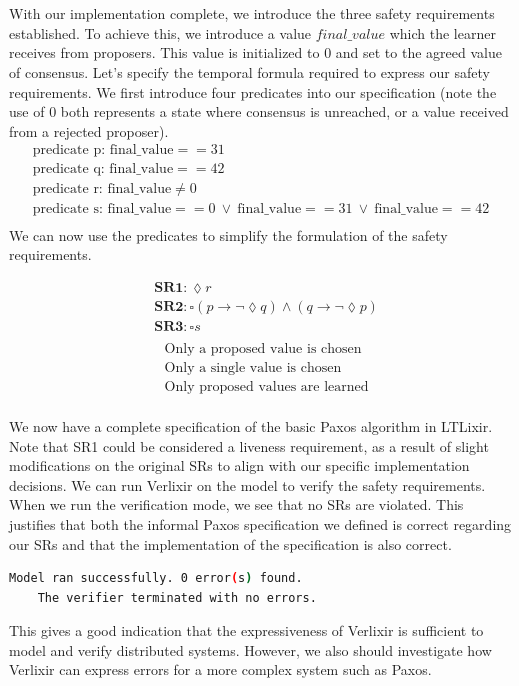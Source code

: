\\ \\
With our implementation complete, we introduce the three safety requirements established. To achieve this, we introduce a value $final\_value$ which the learner receives from proposers. This value is initialized to $0$ and set to the agreed value of consensus. Let's specify the temporal formula required to express our safety requirements. We first introduce four predicates into our specification (note the use of $0$ both represents a state where consensus is unreached, or a value received from a rejected proposer).
\[
\begin{array}{l}
\text{predicate p: final\_value} == 31 \\
\text{predicate q: final\_value} == 42 \\
\text{predicate r: final\_value} \neq 0 \\
\text{predicate s: final\_value} == 0 \ \lor \ \text{final\_value} == 31 \ \lor \ \text{final\_value} == 42 \\
\end{array}
\]
We can now use the predicates to simplify the formulation of the safety requirements.
\begin{multicols}{2}
    \[
    \begin{aligned}
    &\textbf{SR1}: \lozenge r \\
    &\textbf{SR2}: \square \left( p \rightarrow \neg \lozenge q \right) \land \left( q \rightarrow \neg \lozenge p \right) \\
    &\textbf{SR3}: \square s \\
    \end{aligned}
    \]
    \vline
    \[
    \begin{aligned}
    &\text{Only a proposed value is chosen} \\
    &\text{Only a single value is chosen} \\
    &\text{Only proposed values are learned} \\
    \end{aligned}
    \]
\end{multicols}
We now have a complete specification of the basic Paxos algorithm in LTLixir. Note that SR1 could be considered a liveness requirement, as a result of slight modifications on the original SRs to align with our specific implementation decisions. We can run Verlixir on the model to verify the safety requirements. When we run the verification mode, we see that no SRs are violated. This justifies that both the informal Paxos specification we defined is correct regarding our SRs and that the implementation of the specification is also correct.
\begin{lstlisting}[language=bash, xleftmargin=.3\linewidth]
    Model ran successfully. 0 error(s) found.
    The verifier terminated with no errors.
\end{lstlisting}
This gives a good indication that the expressiveness of Verlixir is sufficient to model and verify distributed systems. However, we also should investigate how Verlixir can express errors for a more complex system such as Paxos. 

